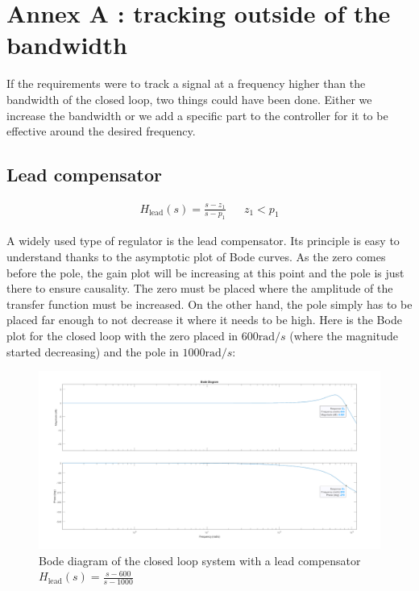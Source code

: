 \appendix

\section{Annex A : tracking outside of the bandwidth}
\label{annex:tracking}

If the requirements were to track a signal at a frequency higher than the bandwidth of the closed loop, two things could 
have been done. Either we increase the bandwidth or we add a specific part to the controller for it to be effective 
around the desired frequency.

\subsection{Lead compensator}

\begin{align}
    H_{\text{lead}}(s) = \frac{s - z_1}{s - p_1} && z_1 < p_1
\end{align}

A widely used type of regulator is the lead compensator. Its principle is easy to understand thanks to the asymptotic
plot of Bode curves. As the zero comes before the pole, the gain plot will be increasing at this point and the pole is 
just there to ensure causality. The zero must be placed where the amplitude of the transfer function must be increased. 
On the other hand, the pole simply has to be placed far enough to not decrease it where it needs to be high. Here is the 
Bode plot for the closed loop with the zero placed in $600 \text{rad}/s$ (where the magnitude started decreasing) 
and the pole in $1000 \text{rad}/s$:

\begin{figure}[H]
    \centering
    \includegraphics[height=\textheight/3]{Pictures/annex_lead_comp.png}
    \caption{Bode diagram of the closed loop system with a lead compensator $H_{\text{lead}}(s) = \frac{s-600}{s-1000}$}
\end{figure}

